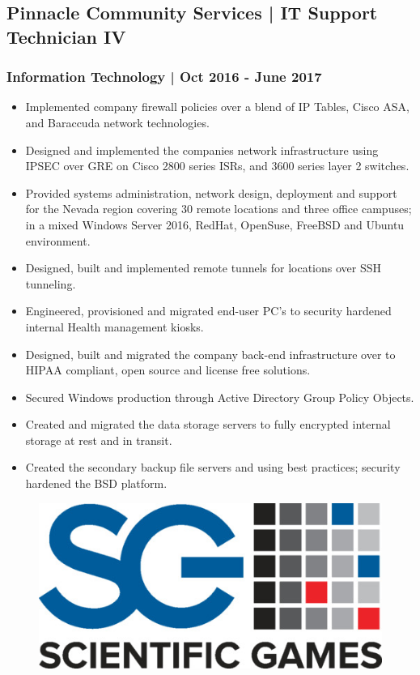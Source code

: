 \documentclass[letter,10pt]{article}
\begin{document}
\subsection*{Pinnacle Community Services | IT Support Technician IV}
\label{sec:orga679eb5}
\subsubsection*{Information Technology | Oct 2016 - June 2017}
\label{sec:org6ad307d}
\begin{itemize}
\item Implemented company firewall policies over a blend of IP Tables, Cisco ASA, and Baraccuda network technologies.
\item Designed and implemented the companies network infrastructure using IPSEC over GRE on Cisco 2800 series ISRs, and 3600 series layer 2 switches.
\item Provided systems administration, network design, deployment and support for the Nevada region covering 30 remote locations and three office campuses; in a mixed Windows Server 2016, RedHat, OpenSuse, FreeBSD and Ubuntu environment.
\item Designed, built and implemented remote tunnels for locations over SSH tunneling.
\item Engineered, provisioned and migrated end-user PC's to security hardened internal Health management kiosks.
\item Designed, built and migrated the company back-end infrastructure over to HIPAA compliant, open source and license free solutions.
\item Secured Windows production through Active Directory Group Policy Objects.
\item Created and migrated the data storage servers to fully encrypted internal storage at rest and in transit.
\item Created the secondary backup file servers and using best practices; security hardened the BSD platform.
\end{itemize}



\begin{figure}
\includegraphics[width=0.8\linewidth]{./img/50p_cr_scientific_games.jpg}
\end{figure}
\end{document}
